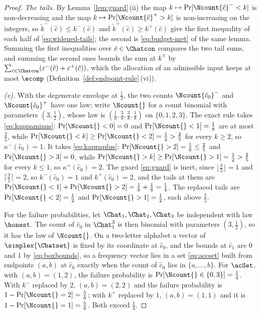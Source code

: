 \begin{proof}
\emph{The tails.} By Lemma~\ref{lem:guard}\,(ii) the map
$k\mapsto\Pr[\Ncount{\hat c}^{-}<k]$ is non-decreasing and the map
$k\mapsto\Pr[\Ncount{\hat c}^{+}>k]$ is non-increasing on the integers, so
$\tilde k^{-}(\hat c)\le k^{-}(\hat c)$ and
$\tilde k^{+}(\hat c)\ge k^{+}(\hat c)$ give the first inequality of each
half of \eqref{eq:widened-tails}; the second is \eqref{eq:budget-met} of the
same lemma. Summing the first inequalities over $\hat c\in\Chatcon$ compares
the two tail sums, and summing the second ones bounds the sum at $k^{\mp}$ by
$\sum_{\hat c\in\Chatcon}(\varepsilon^{-}(\hat c)+\varepsilon^{+}(\hat c))$,
which the allocation of an admissible input keeps at most $\ecomp$
(Definition~\ref{def:endpoint-rule}\,(vi)).

\emph{(v).} With the degenerate envelope at $\tfrac12$, the two counts
$\Ncount{\hat c_0}^{-}$ and $\Ncount{\hat c_0}^{+}$ have one law; write
$\Ncount{}$ for a count binomial with parameters $(3,\tfrac12)$, whose law is
$(\tfrac18,\tfrac38,\tfrac38,\tfrac18)$ on $\{0,1,2,3\}$. The exact rule
takes \eqref{eq:kappaminus}: $\Pr[\Ncount{}<0]=0$ and
$\Pr[\Ncount{}<1]=\tfrac18$ are at most $\tfrac25$, while
$\Pr[\Ncount{}<k]\ge\Pr[\Ncount{}<2]=\tfrac12>\tfrac25$ for every $k\ge2$, so
$\kappa^{-}(\hat c_0)=1$. It takes \eqref{eq:kappaplus}:
$\Pr[\Ncount{}>2]=\tfrac18\le\tfrac25$ and $\Pr[\Ncount{}>3]=0$, while
$\Pr[\Ncount{}>k]\ge\Pr[\Ncount{}>1]=\tfrac12>\tfrac25$ for every $k\le1$, so
$\kappa^{+}(\hat c_0)=2$. The guard \eqref{eq:guard} is inert, since
$\lfloor\tfrac32\rfloor=1$ and $\lceil\tfrac32\rceil=2$, so
$k^{-}(\hat c_0)=1$ and $k^{+}(\hat c_0)=2$, and the tails at them are
$\Pr[\Ncount{}<1]+\Pr[\Ncount{}>2]=\tfrac18+\tfrac18=\tfrac14$. The replaced
tails are $\Pr[\Ncount{}<2]=\tfrac12$ and $\Pr[\Ncount{}>1]=\tfrac12$, each
above $\tfrac25$.

For the failure probabilities, let $\Chat_1,\Chat_2,\Chat_3$ be independent
with law $\honest$. The count of $\hat c_0$ in $\Chat_1^3$ is then binomial
with parameters $(3,\tfrac12)$, so it has the law of $\Ncount{}$. On a
two-letter alphabet a vector of $\simplex{\Chatset}$ is fixed by its
coordinate at $\hat c_0$, and the bounds at $\hat c_1$ are $0$ and $1$ by
\eqref{eq:boxbounds}, so a frequency vector lies in a set \eqref{eq:accset}
built from endpoints $(a,b)$ at $\hat c_0$ exactly when the count of
$\hat c_0$ lies in $\{a,\dots,b\}$. For $\acSet$, with $(a,b)=(1,2)$, the
failure probability is $\Pr[\Ncount{}\in\{0,3\}]=\tfrac14$. With $k^{-}$
replaced by $2$, $(a,b)=(2,2)$ and the failure probability is
$1-\Pr[\Ncount{}=2]=\tfrac58$; with $k^{+}$ replaced by $1$, $(a,b)=(1,1)$
and it is $1-\Pr[\Ncount{}=1]=\tfrac58$. Both exceed $\tfrac14$.
\end{proof}
